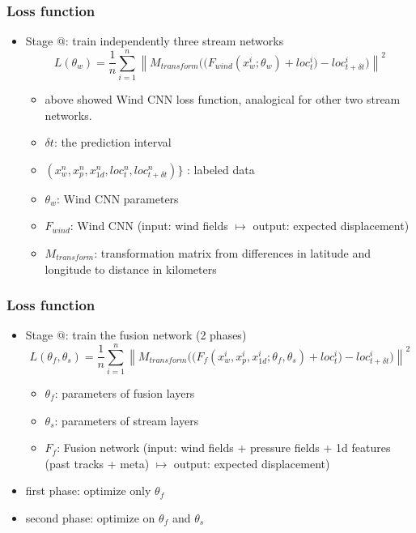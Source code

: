 \documentclass{beamer}
\makeatletter
\newcommand{\Rmnum}[1]{\expandafter\@slowromancap\romannumeral #1@}
\makeatother
\begin{document}
\begin{frame}
\frametitle{Loss function}
\begin{itemize}
	\item Stage \Rmnum{1}: train independently three stream networks
	\begin{equation*}
	\label{eq}
	L(\theta_w) = \frac{1}{n}\sum_{i=1}^{n} \left \| {M_{transform}((F_{wind}(x_w^i; \theta_w)} + loc^i_{t} ) - loc^i_{t+\delta t} ) \right \| ^2
	\end{equation*}
	\begin{itemize}
		\item above showed Wind CNN loss function, analogical for other two stream networks.
		\item $\delta t$: the prediction interval
		\item $(x_w^n, x_p^n, x_{1d}^n, loc_t^n, loc_{t+\delta t}^n)\}$ : labeled data
		\item $\theta_{w}$: Wind CNN parameters
		\item $F_{wind}$: Wind CNN (input: wind fields $\mapsto$ output: expected displacement)
		\item $M_{transform}$: transformation matrix from differences in latitude and longitude to distance in kilometers
	\end{itemize}
\end{itemize}
\end{frame}


\begin{frame}
\frametitle{Loss function}
\begin{itemize}
	\item Stage \Rmnum{2}: train the fusion network (2 phases)
	\begin{equation*}
	\label{eq_fusion_2}
	L(\theta_{f}, \theta_{s}) = \frac{1}{n}\sum_{i=1}^{n} \left \| {M_{transform}((F_{f}(x_w^i, x_p^i, x_{1d}^i; \theta_{f}, \theta_{s})} + loc^i_{t} ) - loc^i_{t+\delta t} ) \right \| ^2
	\end{equation*}
	\begin{itemize}
		\item $\theta_{f}$: parameters of fusion layers 
		\item $\theta_{s}$: parameters of stream layers
		\item $F_{f}$: Fusion network (input: wind fields + pressure fields + 1d features (past tracks + meta) $\mapsto$ output: expected displacement)
	\end{itemize}
	\item first phase:  optimize only $\theta_{f}$
	
	
	\item second phase: optimize on $\theta_{f}$ and $\theta_{s}$

\end{itemize}
\end{frame}
\end{document}
